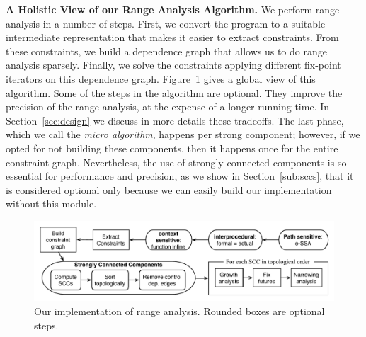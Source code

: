 \documentclass{paper}
\begin{document}
\noindent
\textbf{A Holistic View of our Range Analysis Algorithm.}
We perform range analysis in a number of steps.
First, we convert the program to a suitable intermediate representation that
makes it easier to extract constraints.
From these constraints, we build a dependence graph that allows us to do
range analysis sparsely.
Finally, we solve the constraints applying different fix-point iterators on
this dependence graph.
Figure~\ref{fig:algorithm} gives a global view of this algorithm.
Some of the steps in the algorithm are optional.
They improve the precision of the range analysis, at the expense of a longer
running time.
In Section~\ref{sec:design} we discuss in more details these tradeoffs.
The last phase, which we call the {\em micro algorithm}, happens per
strong component; however, if we opted for not building these components,
then it happens once for the entire constraint graph.
Nevertheless, the use of strongly connected components
is so essential for performance and precision, as we show in
Section~\ref{sub:sccs}, that it is considered optional only because we
can easily build our implementation without this module.

\begin{figure}[t!]
\begin{center}
\includegraphics[width=\textwidth]{images/algorithm}
\end{center}
\caption{\label{fig:algorithm}
Our implementation of range analysis. Rounded boxes are optional steps.}
\end{figure}
\end{document}
